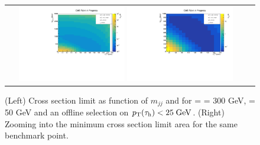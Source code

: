 \begin{figure}[tbh!]
	\centering
	\begin{tabular}{cc}
		\includegraphics[width=0.45\textwidth]{analysis/pics/JetInvMass_vs_MET_xsec_chi300_lsp050_taupt25.pdf}
		\includegraphics[width=0.45\textwidth]{analysis/pics/JetInvMass_vs_MET_xsec_chi300_lsp050_taupt25_zoom.pdf} 		
	\end{tabular}
	\caption{(Left) Cross section limit as function of $m_{jj}$ and \met for \charginopm = \neutralinotwo = 300 GeV, \neutralinoone = 50 GeV and an offline selection on $p_{\text{T}}(\tau_{\text{h}}) <  25\;\text{Ge}\kern-0.06667em\text{V}$. (Right) Zooming into the minimum cross section limit area for the same benchmark point.}
	\label{fig::JetInvMass_vs_MET_xsec_chi300_lsp050_taupt25}
\end{figure}

